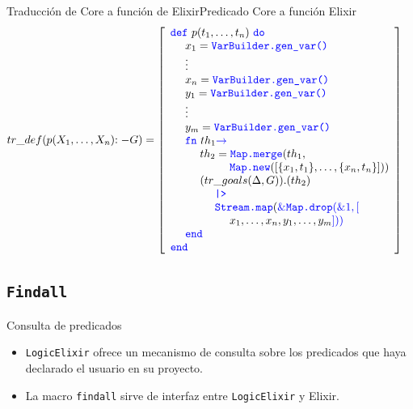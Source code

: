 \documentclass[14pt,aspectratio=169]{beamer}
\begin{document}
\begin{frame}{Traducción de Core a función de Elixir}{Predicado Core a función Elixir}
  \scriptsize \begin{align*}
    tr\_def(p(X_1, \ldots, X_n)\mathit{:-} G) & = \left[
      \begin{array}{lrl}
        \textcolor{blue}{\texttt{def}}\,\, p(t_1, \ldots, t_n)\,\, \textcolor{blue}{\texttt{do}} \\
          \ \ \ \ x_1 = \textcolor{blue}{\texttt{VarBuilder.gen\_var()}} \\
          \ \ \ \ \vdots \\
          \ \ \ \ x_n = \textcolor{blue}{\texttt{VarBuilder.gen\_var()}} \\
          \ \ \ \ y_1 = \textcolor{blue}{\texttt{VarBuilder.gen\_var()}} \\
          \ \ \ \ \vdots \\
          \ \ \ \ y_m = \textcolor{blue}{\texttt{VarBuilder.gen\_var()}} \\
          \ \ \ \ \textcolor{blue}{\texttt{fn}}\,\, th_1 \textcolor{blue}{\rightarrow} \\
          \ \ \ \ \ \ \ \ th_2 = \textcolor{blue}{\texttt{Map.merge}}(th_1, \\
          \ \ \ \ \ \ \ \ \ \ \ \ \ \ \ \ \textcolor{blue}{\texttt{Map.new}}([\{x_1, t_1\}, \ldots, \{x_n, t_n\}])) \\
          \ \ \ \ \ \ \ \ (tr\_goals(\Delta, G)).(th_2) \\
          \ \ \ \ \ \ \ \ \ \ \ \ \textcolor{blue}{\texttt{|>}} \\
          \ \ \ \ \ \ \ \ \ \ \ \ \textcolor{blue}{\texttt{Stream.map}}(\textcolor{blue}{\&\texttt{Map.drop}(\&1, [}\\
          \ \ \ \ \ \ \ \ \ \ \ \ \ \ \ \ x_1, \ldots, x_n, y_1, \ldots, y_m\textcolor{blue}{]))}\\
          \ \ \ \ \textcolor{blue}{\texttt{end}} \\
          \textcolor{blue}{\texttt{end}}
      \end{array}
    \right]
  \end{align*}
\end{frame}

\subsection{\texttt{Findall}}
\begin{frame}{Consulta de predicados}
  \begin{itemize}
    \item \texttt{LogicElixir} ofrece un mecanismo de consulta sobre los
    predicados que haya declarado el usuario en su proyecto.
    \item La macro \texttt{findall} sirve de interfaz entre \texttt{LogicElixir}
    y Elixir.
  \end{itemize}
\end{frame}
\end{document}
